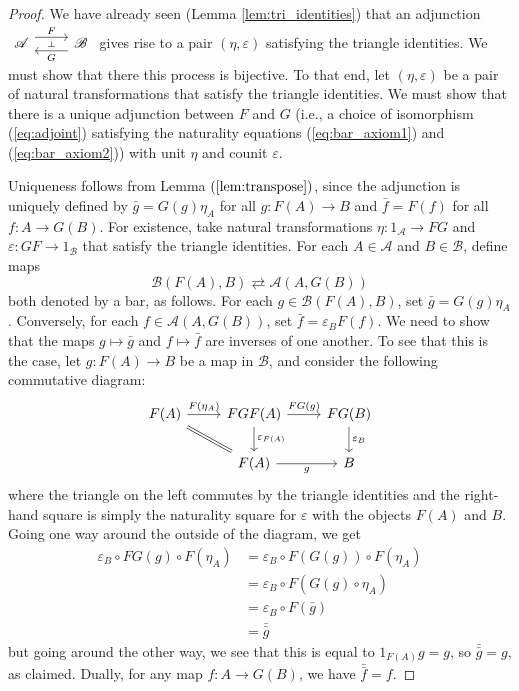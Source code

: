 \documentclass[10pt,oneside]{book}
\def\~#1{\mathscr{#1}}
\newcommand{\ve}{\varepsilon}
\theoremstyle{plain}
\theoremstyle{definition}
\theoremstyle{remark}
\numberwithin{equation}{section}
\numberwithin{figure}{section}
\begin{document}
\begin{proof}
    We have already seen (Lemma \ref{lem:tri_identities}) that an adjunction $\begin{tikzcd}
    {\~A} & {\~B}
    \arrow[""{name=0, anchor=center, inner sep=0}, "F", shift left=2, from=1-1, to=1-2]
    \arrow[""{name=1, anchor=center, inner sep=0}, "G", shift left=2, from=1-2, to=1-1]
    \arrow["\dashv"{anchor=center, rotate=-90}, draw=none, from=0, to=1]
\end{tikzcd}$ gives rise to a pair $(\eta, \ve)$ satisfying the triangle identities. We must show that there this process is bijective. To that end, let $(\eta, \ve)$ be a pair of natural transformations that satisfy the triangle identities. We must show that there is a unique adjunction between $F$ and $G$ (i.e., a choice of isomorphism (\ref{eq:adjoint}) satisfying the naturality equations (\ref{eq:bar_axiom1}) and (\ref{eq:bar_axiom2})) with unit $\eta$ and counit $\ve$.

Uniqueness follows from Lemma $(\ref{lem:transpose})$, since the adjunction is uniquely defined by $\bar{g} = G(g) \eta_A$ for all $g: F(A) \to B$ and $\bar{f} = F(f) $ for all $f: A \to G(B)$. For existence, take natural transformations $\eta: 1_{\~A} \to FG$ and $\ve: GF \to 1_{\~B}$ that satisfy the triangle identities. For each $A \in \~A$ and $B \in \~B$, define maps
\begin{equation}
\label{eq:functions}
\~B(F(A), B) \rightleftarrows \~A(A, G(B))
\end{equation} 
both denoted by a bar, as follows. For each $g \in \~B(F(A), B)$, set $\bar{g} = G(g)\eta_A$. Conversely, for each $f \in \~A(A, G(B))$, set $\bar{f} = \ve_B F(f)$. We need to show that the maps $g \mapsto \bar{g}$ and $f \mapsto \bar{f}$ are inverses of one another. To see that this is the case, let $g: F(A) \to B$ be a map in $\~B$, and consider the following commutative diagram:
\[\begin{tikzcd}
    {F(A)} & {FGF(A)} & {FG(B)} \\
    & {F(A)} & B
    \arrow["{F(\eta_A)}", from=1-1, to=1-2]
    \arrow[Rightarrow, no head, from=1-1, to=2-2]
    \arrow["{FG(g)}", from=1-2, to=1-3]
    \arrow["{\ve_{F(A)}}", from=1-2, to=2-2]
    \arrow["{\ve_B}", from=1-3, to=2-3]
    \arrow["g"', from=2-2, to=2-3]
\end{tikzcd}\]
where the triangle on the left commutes by the triangle identities and the right-hand square is simply the naturality square for $\ve$ with the objects $F(A)$ and $B$. Going one way around the outside of the diagram, we get
\begin{align*}
\ve_B \circ FG(g) \circ F(\eta_A) &= \ve_B \circ F(G(g)) \circ F(\eta_A)  \\
                    &= \ve_B \circ F\left(G(g) \circ \eta_A \right)\\
                    &= \ve_B \circ F(\bar{g})\\
                    &= \bar{\bar{g}}
\end{align*}
but going around the other way, we see that this is equal to $1_{F(A)}g = g$, so $\bar{\bar{g}} = g$, as claimed. Dually, for any map $f: A \to G(B)$, we have $\bar{\bar{f}} = f$. 


\end{proof}
\end{document}
